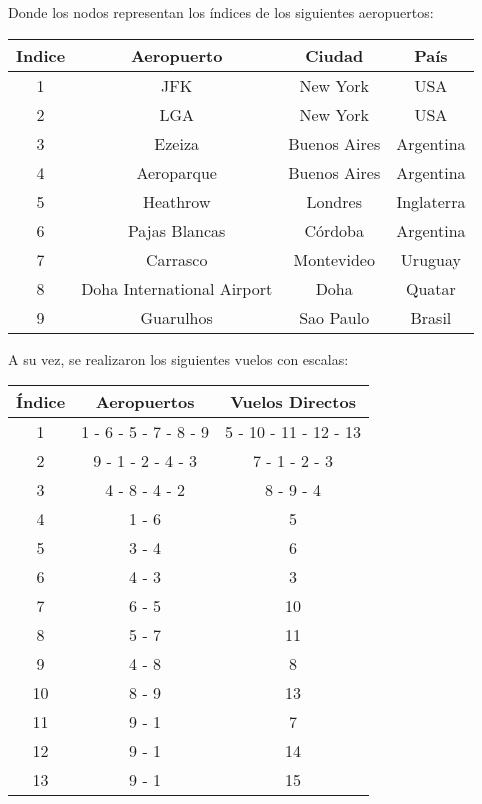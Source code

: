 \documentclass{article}
\begin{document}
Donde los nodos representan los índices de los siguientes aeropuertos:
\begin{center}
	\begin{tabular}{ c | c | c | c}
	  \textbf{Indice} & \textbf{Aeropuerto} & \textbf{Ciudad} & \textbf{País}\\ \hline
	  1 & JFK & New York & USA \\
	  2 & LGA & New York & USA \\
	  3 & Ezeiza & Buenos Aires & Argentina\\
	  4 & Aeroparque & Buenos Aires & Argentina\\
	  5 & Heathrow & Londres & Inglaterra \\
	  6 & Pajas Blancas & Córdoba & Argentina \\
	  7 & Carrasco & Montevideo & Uruguay \\
	  8 & Doha International Airport & Doha & Quatar \\
	  9 & Guarulhos & Sao Paulo & Brasil \\
	  
	\end{tabular}	
\end{center}

A su vez, se realizaron los siguientes vuelos con escalas:
\begin{center}
	\begin{tabular}{ c | c | c }
	\textbf{Índice} & \textbf{Aeropuertos} & \textbf{Vuelos Directos} \\ \hline
	1 & 1 - 6 - 5 - 7 - 8 - 9 & 5 - 10 - 11 - 12 - 13 \\
	2 & 9 - 1 - 2 - 4 - 3 & 7 - 1 - 2 - 3 \\
	3 & 4 - 8 - 4 - 2 & 8 - 9 - 4 \\
	4 & 1 - 6 & 5 \\
	5 & 3 - 4 & 6 \\
	6 & 4 - 3 & 3 \\
	7 & 6 - 5 & 10 \\
	8 & 5 - 7 & 11 \\
	9 & 4 - 8 & 8 \\
	10 & 8 - 9 & 13 \\
	11 & 9 - 1 & 7 \\
	12 & 9 - 1 & 14 \\
	13 & 9 - 1 & 15 \\
	\end{tabular}
\end{center}
\end{document}
